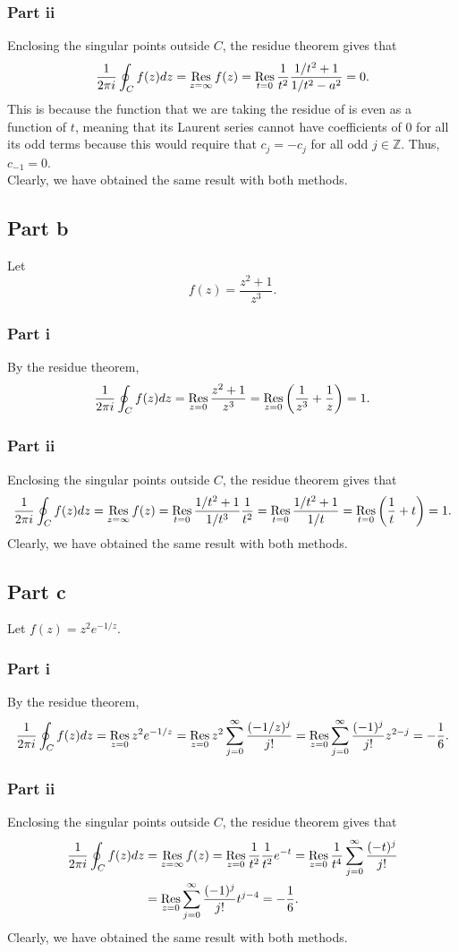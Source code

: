 \documentclass{article}
\begin{document}
\subsubsection{Part ii}
Enclosing the singular points outside $C$, the residue theorem gives that 
\[
\frac{1}{2\pi i}\oint_Cf(z)dz=\operatorname*{Res}_{z=\infty}f(z)=\operatorname*{Res}_{t=0}\frac{1}{t^2}\frac{1/t^2+1}{1/t^2-a^2}=0.
\]
This is because the function that we are taking the residue of is even as a function of $t$, meaning that its Laurent series cannot have coefficients of 0 for all its odd terms because this would require that $c_j=-c_j$ for all odd $j\in\mathbb{Z}$. Thus, $c_{-1}=0$. \\
Clearly, we have obtained the same result with both methods.

\subsection{Part b}
Let \[
f(z)=\frac{z^2 + 1}{z^3}.
\]
\subsubsection{Part i}
By the residue theorem, 
\[
\frac{1}{2\pi i}\oint_Cf(z)dz=\operatorname*{Res}_{z=0}\frac{z^2+1}{z^3}=\operatorname*{Res}_{z=0}\left(\frac{1}{z^3}+\frac{1}{z}\right)=1.
\]
\subsubsection{Part ii}
Enclosing the singular points outside $C$, the residue theorem gives that 
\[
\frac{1}{2\pi i}\oint_Cf(z)dz=\operatorname*{Res}_{z=\infty}f(z)=\operatorname*{Res}_{t=0}\frac{1/t^2+1}{1/t^3}\frac{1}{t^2}=\operatorname*{Res}_{t=0}\frac{1/t^2+1}{1/t}=\operatorname*{Res}_{t=0}\left(\frac{1}{t}+t\right)=1.
\]
Clearly, we have obtained the same result with both methods.

\subsection{Part c}
Let $f(z)=z^2 e^{-1/z}$.
\subsubsection{Part i}
By the residue theorem, 
\[
\frac{1}{2\pi i}\oint_Cf(z)dz=\operatorname*{Res}_{z=0}z^2 e^{-1/z}=\operatorname*{Res}_{z=0}z^2\sum_{j=0}^\infty\frac{(-1/z)^j}{j!}=\operatorname*{Res}_{z=0}\sum_{j=0}^\infty\frac{(-1)^j}{j!}z^{2-j}=-\frac{1}{6}.
\]
\subsubsection{Part ii}
Enclosing the singular points outside $C$, the residue theorem gives that 
\begin{align*}
\frac{1}{2\pi i}\oint_Cf(z)dz&=\operatorname*{Res}_{z=\infty}f(z)=\operatorname*{Res}_{z=0}\frac{1}{t^2}\frac{1}{t^2}e^{-t}=\operatorname*{Res}_{z=0}\frac{1}{t^4}\sum_{j=0}^\infty\frac{(-t)^j}{j!}\\&=
\operatorname*{Res}_{z=0}\sum_{j=0}^\infty\frac{(-1)^j}{j!}t^{j-4}=-\frac{1}{6}.
\end{align*}
Clearly, we have obtained the same result with both methods.
\end{document}
